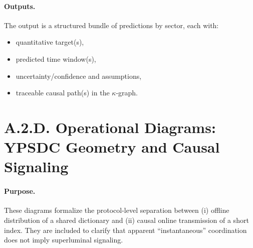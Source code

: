 \documentclass[13pt,a4paper]{article}
\begin{document}
	\paragraph{Outputs.}
	The output is a structured bundle of predictions by sector, each with:
	\begin{itemize}[leftmargin=*]
		\item quantitative target(s),
		\item predicted time window(s),
		\item uncertainty/confidence and assumptions,
		\item traceable causal path(s) in the $\kappa$-graph.
	\end{itemize}
	
	\section*{A.2.D. Operational Diagrams: YPSDC Geometry and Causal Signaling}
	
	\paragraph{Purpose.}
	These diagrams formalize the protocol-level separation between (i) offline distribution of a shared dictionary and (ii) causal online transmission of a short index. They are included to clarify that apparent ``instantaneous'' coordination does not imply superluminal signaling.
	
\end{document}
